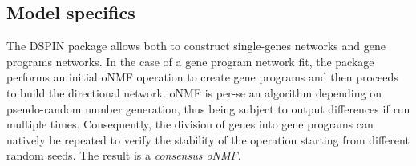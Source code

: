 \documentclass[11pt,a4paper]{article}
\begin{document}
%
%
%
%
%
%
%
%
%
%
%
%
%

\subsection{Model specifics}

The DSPIN package allows both to construct single-genes networks and gene programs networks. In the case of a gene program network fit, the package performs an initial oNMF operation to create gene programs and then proceeds to build the directional network. oNMF is per-se an algorithm depending on pseudo-random number generation, thus being subject to output differences if run multiple times. Consequently, the division of genes into gene programs can natively be repeated to verify the stability of the operation starting from different random seeds. The result is a \textit{consensus oNMF}. 
\end{document}
